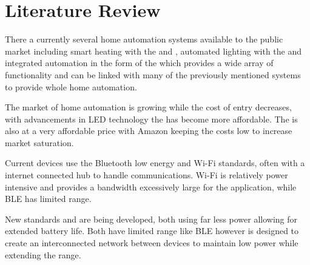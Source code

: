 \section{Literature Review}\label{literature-review}

There a currently several home automation systems available to the
public market including smart heating with the \cite{hive} and
\cite{nest}, automated lighting with the \cite{philipshue} and
integrated automation in the form of the \cite{echo} which provides a
wide array of functionality and can be linked with many of the
previously mentioned systems to provide whole home automation.

The market of home automation is growing while the cost of entry
decreases, with advancements in LED technology the \cite{philipshue} has
become more affordable. The \cite{echo} is also at a very affordable
price with Amazon keeping the costs low to increase market saturation.

Current devices use the Bluetooth low energy and Wi-Fi standards, often
with a internet connected hub to handle communications. Wi-Fi is
relatively power intensive and provides a bandwidth excessively large
for the application, while BLE has limited range.

New standards \cite{zwave} and \cite{zigbee} are being developed, both
using far less power allowing for extended battery life. Both have
limited range like BLE however \cite{zwave} is designed to create an
interconnected network between devices to maintain low power while
extending the range.
